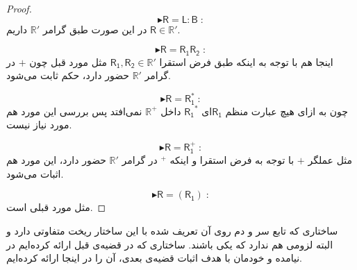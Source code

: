 \begin{proof}
	
	$$\blacktriangleright \mathsf{R=L:B}\;:$$
	در این صورت طبق گرامر $\mathbb{R'}$ داریم  
	$\mathsf{R} \in \mathbb{R'}$.
	
	$$\blacktriangleright \mathsf{R=R_1 R_2}\;:$$
	اینجا هم با توجه به اینکه طبق فرض استقرا 
	$\mathsf{R_1 , R_2} \in \mathbb{R'}$
	مثل مورد قبل چون $+$ در گرامر $\mathbb{R'}$ حضور دارد، حکم ثابت می‌شود.
	
	$$\blacktriangleright \mathsf{R=R_1^*}\;:$$
	چون به ازای هیچ عبارت منظم $\mathsf{R_1}$ای 
	$\mathsf{R_1}^*$ داخل $\mathbb{R^+}$ نمی‌افتد پس بررسی این مورد هم مورد نیاز نیست.
	
	
	$$\blacktriangleright \mathsf{R=R_1^+}\;:$$
	مثل عملگر $+$ با توجه به فرض استقرا و اینکه $ ^+$ در گرامر $\mathbb{R'}$ حضور دارد، این مورد هم اثبات می‌شود.
	
	
	$$\blacktriangleright \mathsf{R=(R_1)}\;:$$
	مثل مورد قبلی است.
	
	
	
	
	
	
	
\end{proof}

ساختاری که تابع سر و دم روی آن تعریف شده با این ساختار ریخت متفاوتی دارد و البته لزومی هم ندارد که یکی باشند. ساختاری که در قضیه‌ی قبل ارائه کرده‌ایم در \cite{calcul} نیامده و خودمان با هدف اثبات قضیه‌ی بعدی، آن را در اینجا ارائه‌ کرده‌ایم.



